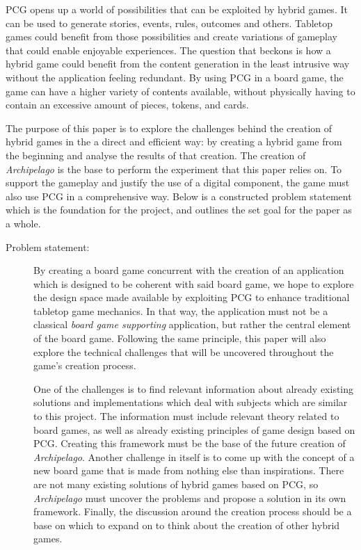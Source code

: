 PCG opens up a world of possibilities that can be exploited by hybrid games. It can be used to generate stories, events, rules, outcomes and others. Tabletop games could benefit from those possibilities and create variations of gameplay that could enable enjoyable experiences. The question that beckons is how a hybrid game could benefit from the content generation in the least intrusive way without the application feeling redundant. By using PCG in a board game, the game can have a higher variety of contents available, without physically having to contain an excessive amount of pieces, tokens, and cards. 

The purpose of this paper is to explore the challenges behind the creation of hybrid games in the a direct and efficient way: by creating a hybrid game from the beginning and analyse the results of that creation. The creation of \textit{Archipelago} is the base to perform the experiment that this paper relies on. To support the gameplay and justify the use of a digital component, the game must also use PCG in a comprehensive way. Below is a constructed problem statement which is the foundation for the project, and outlines the set goal for the paper as a whole.

\begin{description}
\item[Problem statement:]

By creating a board game concurrent with the creation of an application which is designed to be coherent with said board game, we hope to explore the design space made available by exploiting PCG to enhance traditional tabletop game mechanics. In that way, the application must not be a classical \textit{board game supporting} application, but rather the central element of the board game. Following the same principle, this paper will also explore the technical challenges that will be uncovered throughout the game's creation process. 

One of the challenges is to find relevant information about already existing solutions and implementations which deal with subjects which are similar to this project. The information must include relevant theory related to board games, as well as already existing principles of game design based on PCG. Creating this framework must be the base of the future creation of \textit{Archipelago}. Another challenge in itself is to come up with the concept of a new board game that is made from nothing else than inspirations. There are not many existing solutions of hybrid games based on PCG, so \textit{Archipelago} must uncover the problems and propose a solution in its own framework. Finally, the discussion around the creation process should be a base on which to expand on to think about the creation of other hybrid games. 
\end{description}

